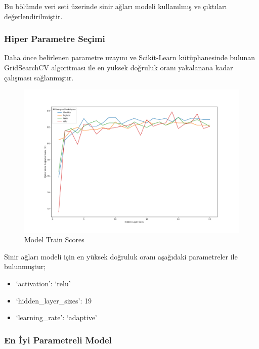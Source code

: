 \documentclass[12pt,twoside]{deuthesis}
\providecommand{\tightlist}{%
  \setlength{\itemsep}{0pt}\setlength{\parskip}{0pt}}
\begin{document}
Bu bölümde veri seti üzerinde sinir ağları modeli kullanılmış ve çıktıları değerlendirilmiştir.

\hypertarget{hiper-parametre-seuxe7imi-7}{%
\subsubsection{Hiper Parametre Seçimi}\label{hiper-parametre-seuxe7imi-7}}

Daha önce belirlenen parametre uzayını ve Scikit-Learn kütüphanesinde bulunan GridSearchCV algoritması ile en yüksek doğruluk oranı yakalanana kadar çalışması sağlanmıştır.
\begin{figure}

{\centering \includegraphics[width=1.1\linewidth,height=0.55\textheight]{figure/NN_bin_Grid_Graph} 

}

\caption{Model Train Scores}\label{fig:unnamed-chunk-71}
\end{figure}
Sinir ağları modeli için en yüksek doğruluk oranı aşağıdaki parametreler ile bulunmuştur;
\begin{itemize}
\tightlist
\item
  `activation': `relu'\\
\item
  `hidden\_layer\_sizes': 19\\
\item
  `learning\_rate': `adaptive'\\
  \newpage  
\end{itemize}
\hypertarget{en-iyi-parametreli-model-5}{%
\subsubsection{En İyi Parametreli Model}\label{en-iyi-parametreli-model-5}}
\end{document}
